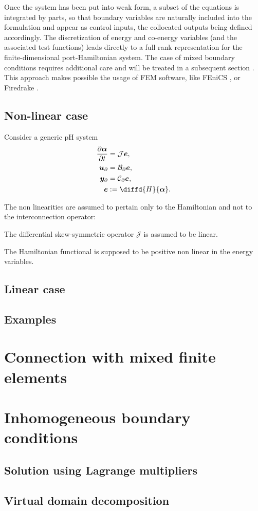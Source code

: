 Once the system has been put into weak form, a subset of the equations is integrated by parts, so that boundary variables are naturally included into the formulation and appear as control inputs, the collocated outputs being defined accordingly. The discretization of energy and co-energy variables (and the associated test functions) leads directly to a full rank representation for the finite-dimensional port-Hamiltonian system. The case of mixed boundary conditions requires additional care and will be treated in a subsequent section . This approach makes possible the usage of FEM software, like FEniCS \cite{logg2012}, or Firedrake \cite{rathgeber2017firedrake}.

\subsection{Non-linear case}
Consider a generic pH system
\begin{equation}
\begin{aligned}
\diffp{\bm{\alpha}}{t} &= \mathcal{J}\displaystyle \bm{e}, \vspace{3pt}\\
\bm{u}_\partial &= \mathcal{B}_\partial  \displaystyle \bm{e}, \vspace{3pt}\\
\bm{y}_\partial &= \mathcal{C}_\partial \displaystyle \bm{e}, \vspace{3pt}\\
\bm{e} &:= \displaystyle \diffd{H}{\bm{\alpha}}.
\end{aligned}
\end{equation}

The non linearities are assumed to pertain only to the Hamiltonian  and not to the interconnection operator:
\begin{assumption}
	The differential skew-symmetric operator $\mathcal{J}$ is assumed to be linear. 
\end{assumption}
The Hamiltonian functional is supposed to be positive non linear in the energy variables.


\subsection{Linear case}

\subsection{Examples}


\section{Connection with mixed finite elements}


\section{Inhomogeneous boundary conditions}\label{sec:mixedbc}

\subsection{Solution using Lagrange multipliers}

\subsection{Virtual domain decomposition}




